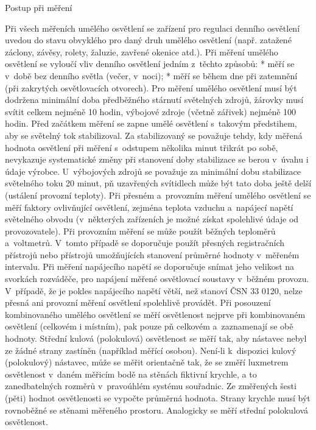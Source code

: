 \sec Postup při měření

Při všech měřeních umělého osvětlení se zařízení pro regulaci denního osvětlení uvedou do stavu
obvyklého pro daný druh umělého osvětlení (např. zatažené záclony, závěsy, rolety, žaluzie, zavřené okenice atd.).
Při měření umělého osvětlení se vyloučí vliv denního osvětlení jedním z~těchto způsobů:
\medskip
\begitems
    * měří se v~době bez denního světla (večer, v~noci);
    * měří se během dne při zatemnění (při zakrytých osvětlovacích otvorech).
\enditems
\medskip
Pro měření umělého osvětlení musí být dodržena minimální doba předběžného stárnutí světelných zdrojů,
žárovky musí svítit celkem nejméně 10 hodin, výbojové zdroje (včetně zářivek) nejméně 100 hodin.
\medskip
Před začátkem měření se zapne umělé osvětlení s~takovým předstihem, aby se světelný tok stabilizoval.
Za stabilizovaný se považuje tehdy, kdy měřená hodnota osvětlení při měření s~odstupem několika minut
třikrát po sobě, nevykazuje systematické změny při stanovení doby stabilizace se berou v~úvahu i údaje výrobce.
U~výbojových zdrojů se považuje za minimální dobu stabilizace světelného toku 20 minut, pň uzavřených
svítidlech může být tato doba ještě delší (ustálení provozní teploty).
\medskip
Při přesném a~provozním měření umělého osvětlení se měří faktory ovlivňující osvětlení, zejména teplota
vzduchu a~napájecí napětí světelného obvodu (v~některých zařízeních je možné získat spolehlivé údaje od
provozovatele). Při provozním měření se může použít běžných teploměrů a~voltmetrů. V~tomto případě se
doporučuje použít přesných registračních přístrojů nebo přístrojů umožňujících stanovení průměrné hodnoty
v~měřeném intervalu. Při měření napájecího napětí se doporučuje snímat jeho velikost na svorkách rozváděče,
pro napájení měřené osvětlovací soustavy v~běžném provozu. V~případě, že je pokles napájecího napětí větší,
než stanoví ČSN 33 0120, nelze přesná ani provozní měření osvětlení spolehlivě provádět.
\medskip
Při posouzení kombinovaného umělého osvětlení se měří osvětlenost nejprve při kombinovaném osvětlení
(celkovém i místním), pak pouze pň celkovém a~zaznamenají se obě hodnoty.
Střední kulová (polokulová) osvětlenost se měří tak, aby nástavec nebyl ze žádné strany zastíněn
(například měřící osobou). Není-li k~dispozici kulový (polokulový) nástavec, může se měřit
orientačně tak, že se změří luxmetrem osvětlenost v~daném měřicím bodě na stěnách fiktivní krychle,
a to zanedbatelných rozměrů v~pravoúhlém systému souřadnic. Ze změřených šesti (pěti) hodnot osvětlenosti
se vypočte průměrná hodnota. Strany krychle musí být rovnoběžné se stěnami měřeného prostoru.
Analogicky se měří střední polokulová osvětlenost.

